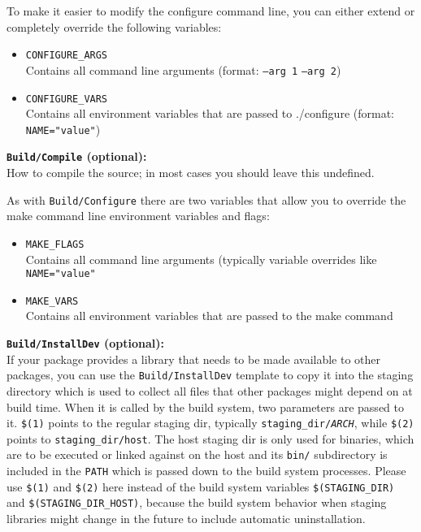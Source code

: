   To make it easier to modify the configure command line, you can either extend or completely override the following variables:
   \begin{itemize}
     \item \texttt{CONFIGURE\_ARGS} \\
	     Contains all command line arguments (format: \texttt{--arg 1} \texttt{--arg 2})
     \item \texttt{CONFIGURE\_VARS} \\
	     Contains all environment variables that are passed to ./configure (format: \texttt{NAME="value"})
   \end{itemize}

\textbf{\texttt{Build/Compile} (optional):} \\
   How to compile the source; in most cases you should leave this undefined.
   
   As with \texttt{Build/Configure} there are two variables that allow you to override
   the make command line environment variables and flags:
   \begin{itemize}
     \item \texttt{MAKE\_FLAGS} \\
	   Contains all command line arguments (typically variable overrides like \texttt{NAME="value"}
	 \item \texttt{MAKE\_VARS} \\
	   Contains all environment variables that are passed to the make command
   \end{itemize}

\textbf{\texttt{Build/InstallDev} (optional):} \\
	If your package provides a library that needs to be made available to other packages,
	you can use the \texttt{Build/InstallDev} template to copy it into the staging directory
	which is used to collect all files that other packages might depend on at build time.
	When it is called by the build system, two parameters are passed to it. \texttt{\$(1)} points to
	the regular staging dir, typically \texttt{staging\_dir/\textit{ARCH}}, while \texttt{\$(2)} points
	to \texttt{staging\_dir/host}. The host staging dir is only used for binaries, which are
	to be executed or linked against on the host and its \texttt{bin/} subdirectory is included
	in the \texttt{PATH} which is passed down to the build system processes.
	Please use \texttt{\$(1)} and \texttt{\$(2)} here instead of the build system variables
	\texttt{\$(STAGING\_DIR)} and \texttt{\$(STAGING\_DIR\_HOST)}, because the build system behavior
	when staging libraries might change in the future to include automatic uninstallation.


